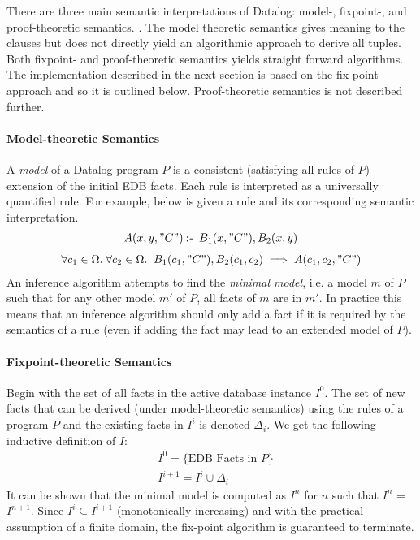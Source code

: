 There are three main semantic interpretations of Datalog: model-, fixpoint-, and proof-theoretic semantics. \cite{Green:2013:DRQ:2688167.2688168}. The model theoretic semantics gives meaning to the clauses but does not directly yield an algorithmic approach to derive all tuples. Both fixpoint- and proof-theoretic semantics yields straight forward algorithms. The implementation described in the next section is based on the fix-point approach and so it is outlined below. Proof-theoretic semantics is not described further.

\paragraph{Model-theoretic Semantics}\NL
A \textit{model} of a Datalog program $P$ is a consistent (satisfying all rules of $P$) extension of the initial EDB facts. Each rule is interpreted as a universally quantified rule. For example, below is given a rule and its corresponding semantic interpretation. 
\begin{align*}
A(x, y, "C") \mathbin{:\hspace{-0.5ex}\textsf{-}} \;B_1(x, "C"), B_2(x, y)
\end{align*}
\begin{align*}
\forall c_1 \in \Omega.\;\forall c_2 \in \Omega.\;\; B_1(c_1, "C"), B_2(c_1,c_2) \implies  A(c_1, c_2, "C")
\end{align*}
An inference algorithm attempts to find the \textit{minimal model}, i.e. a model $m$ of $P$ such that for any other model $m'$ of $P$, all facts of $m$ are in $m'$. In practice this means that an inference algorithm should only add a fact if it is required by the semantics of a rule (even if adding the fact may lead to an extended model of $P$). 

\paragraph{Fixpoint-theoretic Semantics}\NL
Begin with the set of all facts in the active database instance $I^0$. The set of new facts that can be derived (under model-theoretic semantics) using the rules of a program $P$ and the existing facts in $I^i$ is denoted $\Delta_i$. We get the following inductive definition of $I$:
\begin{align*}
&I^0 = \{ \text{EDB Facts in } P \}\\
&I^{i + 1} = I^i \cup \Delta_i 
\end{align*}
It can be shown\cite{Green:2013:DRQ:2688167.2688168} that the minimal model is computed as $I^{n}$ for $n$ such that $I^{n}$ = $I^{n + 1}$. Since $I^i \subseteq I^{i + 1}$ (monotonically increasing) and with the practical assumption of a finite domain, the fix-point algorithm is guaranteed to terminate.

